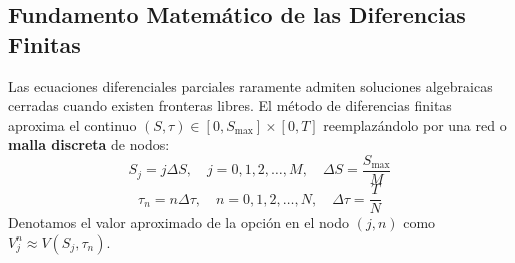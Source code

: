 \documentclass[11pt,a4paper]{article}
\begin{document}
\subsection{Fundamento Matemático de las Diferencias Finitas}
Las ecuaciones diferenciales parciales raramente admiten soluciones algebraicas cerradas cuando existen fronteras libres. El método de diferencias finitas aproxima el continuo $(S, \tau) \in [0, S_{\max}] \times [0, T]$ reemplazándolo por una red o \textbf{malla discreta} de nodos:
\begin{equation}
    S_j = j \Delta S, \quad j = 0, 1, 2, \dots, M, \quad \Delta S = \frac{S_{\max}}{M}
\end{equation}
\begin{equation}
    \tau_n = n \Delta \tau, \quad n = 0, 1, 2, \dots, N, \quad \Delta \tau = \frac{T}{N}
\end{equation}
Denotamos el valor aproximado de la opción en el nodo $(j, n)$ como $V_j^n \approx V(S_j, \tau_n)$.
\end{document}
